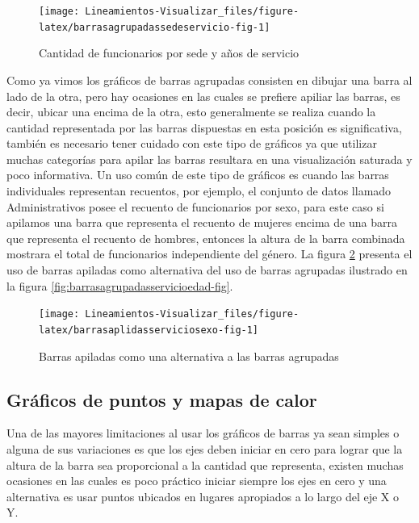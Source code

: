\documentclass[
]{book}
\begin{document}
\begin{figure}

{\centering \texttt{[image: Lineamientos-Visualizar\_files/figure-latex/barrasagrupadassedeservicio-fig-1]} 

}

\caption{Cantidad de funcionarios por sede y años de servicio}\label{fig:barrasagrupadassedeservicio-fig}
\end{figure}

Como ya vimos los gráficos de barras agrupadas consisten en dibujar una barra al lado de la otra, pero hay ocasiones en las cuales se prefiere apiliar las barras, es decir, ubicar una encima de la otra, esto generalmente se realiza cuando la cantidad representada por las barras dispuestas en esta posición es significativa, también es necesario tener cuidado con este tipo de gráficos ya que utilizar muchas categorías para apilar las barras resultara en una visualización saturada y poco informativa. Un uso común de este tipo de gráficos es cuando las barras individuales representan recuentos, por ejemplo, el conjunto de datos llamado Administrativos posee el recuento de funcionarios por sexo, para este caso si apilamos una barra que representa el recuento de mujeres encima de una barra que representa el recuento de hombres, entonces la altura de la barra combinada mostrara el total de funcionarios independiente del género. La figura \ref{fig:barrasaplidasserviciosexo-fig} presenta el uso de barras apiladas como alternativa del uso de barras agrupadas ilustrado en la figura \ref{fig:barrasagrupadasservicioedad-fig}.

\begin{figure}

{\centering \texttt{[image: Lineamientos-Visualizar\_files/figure-latex/barrasaplidasserviciosexo-fig-1]} 

}

\caption{Barras apiladas como una alternativa a las barras agrupadas}\label{fig:barrasaplidasserviciosexo-fig}
\end{figure}

\hypertarget{gruxe1ficos-de-puntos-y-mapas-de-calor}{%
\subsection{Gráficos de puntos y mapas de calor}\label{gruxe1ficos-de-puntos-y-mapas-de-calor}}

Una de las mayores limitaciones al usar los gráficos de barras ya sean simples o alguna de sus variaciones es que los ejes deben iniciar en cero para lograr que la altura de la barra sea proporcional a la cantidad que representa, existen muchas ocasiones en las cuales es poco práctico iniciar siempre los ejes en cero y una alternativa es usar puntos ubicados en lugares apropiados a lo largo del eje X o Y.
\end{document}
